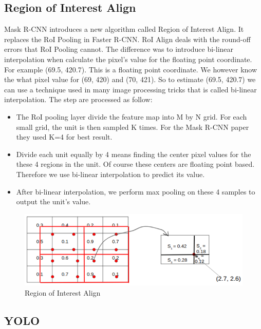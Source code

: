 \subsection{Region of Interest Align}
Mask R-CNN introduces a new algorithm called Region of Interest Align. It replaces the RoI Pooling in Faster R-CNN. RoI Align deals with the round-off errors that RoI Pooling cannot. 
The difference was to introduce bi-linear interpolation when calculate the pixel’s value for the floating point coordinate. For example (69.5, 420.7). This is a floating point coordinate. We however know the what pixel value for (69, 420) and (70, 421). So to estimate (69.5, 420.7) we can use a technique used in many image processing tricks that is called bi-linear interpolation.
The step are processed as follow:
\begin{itemize}
\item The RoI pooling layer divide the feature map into M by N grid. For each small grid, the unit is then sampled K times. For the Mask R-CNN paper they used K=4 for best result.
\item Divide each unit equally by 4 means finding the center pixel values for the these 4 regions in the unit. Of course these centers are floating point based. Therefore we use bi-linear interpolation to predict its value.
\item After bi-linear interpolation, we perform max pooling on these 4 samples to output the unit’s value.
\end{itemize}

\begin{figure}[!t]
\centering
\includegraphics[width=14cm]{Images/recognition/RoI_Align.png}
\caption{Region of Interest Align}
\end{figure}

\subsection{YOLO}
